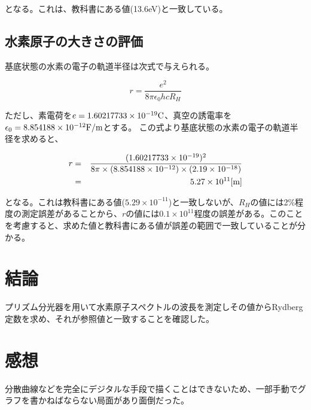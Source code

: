 \documentclass[uplatex,11pt]{jsarticle}
\begin{document}
となる。これは、教科書にある値(13.6eV)と一致している。

\subsection{水素原子の大きさの評価}

基底状態の水素の電子の軌道半径は次式で与えられる。

\[
    r = \frac{e^2}{8\pi \epsilon_0 hcR_H}
\]

ただし、素電荷を$e = 1.60217733 \times 10^{-19} {\rm C}$、真空の誘電率を$\epsilon_0 = 8.854188 \times 10^{-12} {\rm F/m}$とする。
この式より基底状態の水素の電子の軌道半径を求めると、

\begin{eqnarray*}
    r & = & \frac{(1.60217733 \times 10^{-19})^2}{8\pi \times (8.854188 \times 10^{-12}) \times (2.19 \times 10^{-18}) } \\
      & = & 5.27 \times 10^{11} [{\rm m}]
\end{eqnarray*}

となる。これは教科書にある値($5.29 \times 10^{-11}$)と一致しないが、$R_H$の値には2\%程度の測定誤差があることから、$r$の値には$0.1 \times 10^{11}$程度の誤差がある。このことを考慮すると、求めた値と教科書にある値が誤差の範囲で一致していることが分かる。

\section{結論}

プリズム分光器を用いて水素原子スペクトルの波長を測定しその値からRydberg定数を求め、それが参照値と一致することを確認した。

\section{感想}

分散曲線などを完全にデジタルな手段で描くことはできないため、一部手動でグラフを書かねばならない局面があり面倒だった。
\end{document}
